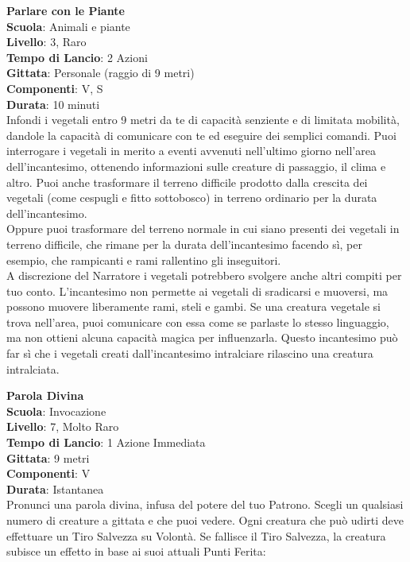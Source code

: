 \begin{multicols}{2}
\medskip\textbf{Parlare con le Piante}\\
\textbf{Scuola}: Animali e piante\\
\textbf{Livello}: 3, Raro\\
\textbf{Tempo di Lancio}: 2 Azioni\\
\textbf{Gittata}: Personale (raggio di 9 metri)\\
\textbf{Componenti}: V, S\\
\textbf{Durata}: 10 minuti\\
Infondi i vegetali entro 9 metri da te di capacità senziente e di limitata mobilità, dandole la capacità di comunicare con te ed eseguire dei semplici comandi. Puoi interrogare i vegetali in merito a eventi avvenuti nell'ultimo giorno nell'area dell'incantesimo, ottenendo informazioni sulle creature di passaggio, il clima e altro. Puoi anche trasformare il terreno difficile prodotto dalla crescita dei vegetali (come cespugli e fitto sottobosco) in terreno ordinario per la durata dell'incantesimo.\\
Oppure puoi trasformare del terreno normale in cui siano presenti dei vegetali in terreno difficile, che rimane per la durata dell'incantesimo facendo sì, per esempio, che rampicanti e rami rallentino gli inseguitori. \\
A discrezione del Narratore i vegetali potrebbero svolgere anche altri compiti per tuo conto. L'incantesimo non permette ai vegetali di sradicarsi e muoversi, ma possono muovere liberamente rami, steli e gambi. Se una creatura vegetale si trova nell'area, puoi comunicare con essa come se parlaste lo stesso linguaggio, ma non ottieni alcuna capacità magica per influenzarla. Questo incantesimo può far sì che i vegetali creati dall'incantesimo intralciare rilascino una creatura intralciata.

\medskip\textbf{Parola Divina}\\
\textbf{Scuola}: Invocazione\\
\textbf{Livello}: 7, Molto Raro\\
\textbf{Tempo di Lancio}: 1 Azione Immediata\\
\textbf{Gittata}: 9 metri\\
\textbf{Componenti}: V\\
\textbf{Durata}: Istantanea\\
Pronunci una parola divina, infusa del potere del tuo Patrono. Scegli un qualsiasi numero di creature a gittata e che puoi vedere. Ogni creatura che può udirti deve effettuare un Tiro Salvezza su Volontà. Se fallisce il Tiro Salvezza, la creatura subisce un effetto in base ai suoi attuali Punti Ferita:\\


\end{multicols}
